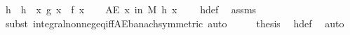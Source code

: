 \begin{isabellebody}
\ h\ \ {\isachardoublequoteopen}h\ {\isacharequal}{\kern0pt}\ {\isacharparenleft}{\kern0pt}{\isasymlambda}x{\isachardot}{\kern0pt}\ g\ x\ {\isacharminus}{\kern0pt}\ f\ x{\isacharparenright}{\kern0pt}{\isachardoublequoteclose}\isanewline
\ \ \isamarkupfalse%
\ {\isachardoublequoteopen}AE\ x\ in\ M{\isachardot}{\kern0pt}\ h\ x\ {\isacharequal}{\kern0pt}\ {}{\isachardoublequoteclose}\ \isamarkupfalse%
\ h{\isacharunderscore}{\kern0pt}def\ \isamarkupfalse%
\ assms\ \isamarkupfalse%
\ {\isacharparenleft}{\kern0pt}subst\ integral{\isacharunderscore}{\kern0pt}nonneg{\isacharunderscore}{\kern0pt}eq{\isacharunderscore}{\kern0pt}{}{\isacharunderscore}{\kern0pt}iff{\isacharunderscore}{\kern0pt}AE{\isacharunderscore}{\kern0pt}banach{\isacharbrackleft}{\kern0pt}symmetric{\isacharbrackright}{\kern0pt}{\isacharparenright}{\kern0pt}\ auto\isanewline
\ \ \isamarkupfalse%
\ \isamarkupfalse%
\ {\isacharquery}{\kern0pt}thesis\ \isamarkupfalse%
\ h{\isacharunderscore}{\kern0pt}def\ \isamarkupfalse%
\ auto\isanewline
{}\isamarkupfalse%
%
\endisatagproof
{\isafoldproof}%
%
\isadelimproof
\isanewline
%
\endisadelimproof
\isanewline
{}\isamarkupfalse%
\isanewline
%
\isadelimtheory
\isanewline
%
\endisadelimtheory
%
\isatagtheory
{}\isamarkupfalse%
%
\endisatagtheory
{\isafoldtheory}%
%
\isadelimtheory
%
\endisadelimtheory
%
\end{isabellebody}%
\endinput
